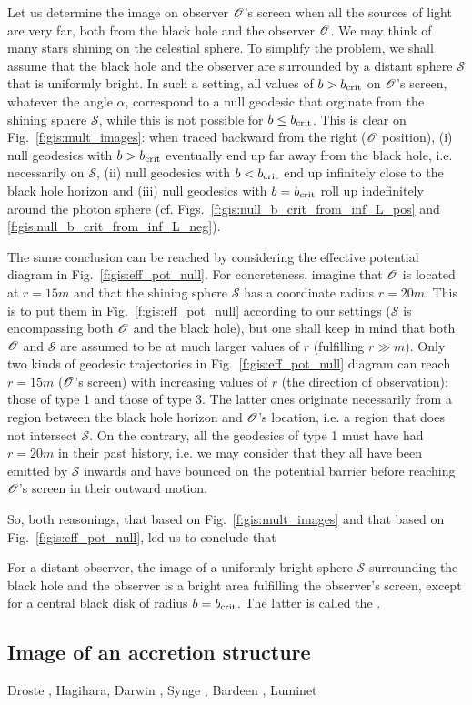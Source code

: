 Let us determine the image on observer $\mathscr{O}$'s screen
when all the sources of light are very far, both
from the black hole and the observer $\mathscr{O}$. We may think of many stars
shining on the celestial sphere. To simplify the problem, we shall assume
that the black hole and the observer are surrounded by a distant
sphere $\mathscr{S}$ that is uniformly bright. In such a setting,
all values of $b > b_{\rm crit}$ on $\mathscr{O}$'s screen, whatever the angle $\alpha$,
correspond to a null geodesic that orginate from the shining sphere $\mathscr{S}$, while
this is not possible for $b \leq b_{\rm crit}$.
This is clear on Fig.~\ref{f:gis:mult_images}: when traced backward from the right
($\mathscr{O}$ position), (i) null geodesics with $b > b_{\rm crit}$ eventually end
up far away from the black hole, i.e. necessarily on $\mathscr{S}$, (ii) null geodesics
with $b < b_{\rm crit}$ end up infinitely close to the black hole horizon
and (iii) null geodesics with $b = b_{\rm crit}$ roll up indefinitely around
the photon sphere (cf. Figs.~\ref{f:gis:null_b_crit_from_inf_L_pos} and
\ref{f:gis:null_b_crit_from_inf_L_neg}).

The same conclusion can be reached
by considering the effective potential diagram in Fig.~\ref{f:gis:eff_pot_null}.
For concreteness, imagine that $\mathscr{O}$ is located at $r=15 m$ and that
the shining sphere $\mathscr{S}$ has a coordinate radius $r=20 m$. This is to put them
in Fig.~\ref{f:gis:eff_pot_null} according
to our settings ($\mathscr{S}$ is encompassing both $\mathscr{O}$ and the black
hole), but one shall keep in mind that both $\mathscr{O}$ and $\mathscr{S}$
are assumed to be at much larger values of $r$ (fulfilling $r\gg m$).
Only two kinds of geodesic
trajectories in Fig.~\ref{f:gis:eff_pot_null} diagram can reach $r = 15m$ ($\mathscr{O}$'s screen) with increasing values
of $r$ (the direction of observation): those of type 1 and those of type 3.
The latter ones originate necessarily from a region between the black hole
horizon and $\mathscr{O}$'s location, i.e. a region that does not intersect $\mathscr{S}$.
On the contrary, all the geodesics of type 1 must have had $r = 20 m$
in their past history, i.e. we may consider that they all have been emitted
by $\mathscr{S}$ inwards and have bounced on the potential barrier before
reaching $\mathscr{O}$'s screen in their outward motion.

So, both reasonings, that based on Fig.~\ref{f:gis:mult_images} and that
based on Fig.~\ref{f:gis:eff_pot_null}, led us to conclude that
\begin{greybox}
For a distant observer, the image of a uniformly bright sphere $\mathscr{S}$ surrounding
the black hole and the observer is a bright area fulfilling
the observer's screen, except for a central black disk of radius $b=b_{\rm crit}$.
The latter is called the
.
\end{greybox}

\subsection{Image of an accretion structure}


\begin{hist}
Droste \cite{Drost1917}, Hagihara,  Darwin \cite{Darwi59}, Synge \cite{Synge66}, Bardeen \cite{Barde73}, Luminet \cite{Lumin79,Lumin19}
\end{hist}





